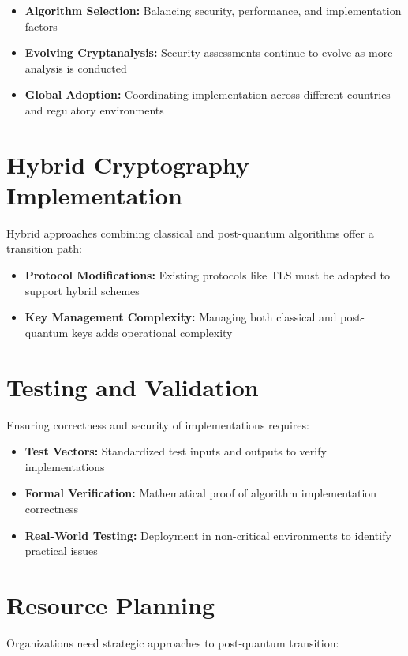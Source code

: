 \begin{itemize}
    \item \textbf{Algorithm Selection:} Balancing security, performance, and implementation factors
    
    \item \textbf{Evolving Cryptanalysis:} Security assessments continue to evolve as more analysis is conducted
    
    \item \textbf{Global Adoption:} Coordinating implementation across different countries and regulatory environments
\end{itemize}

\section{Hybrid Cryptography Implementation}
Hybrid approaches combining classical and post-quantum algorithms offer a transition path:

\begin{itemize}
    \item \textbf{Protocol Modifications:} Existing protocols like TLS must be adapted to support hybrid schemes
    
    \item \textbf{Key Management Complexity:} Managing both classical and post-quantum keys adds operational complexity
\end{itemize}

\section{Testing and Validation}
Ensuring correctness and security of implementations requires:

\begin{itemize}
    \item \textbf{Test Vectors:} Standardized test inputs and outputs to verify implementations
    
    \item \textbf{Formal Verification:} Mathematical proof of algorithm implementation correctness
    
    \item \textbf{Real-World Testing:} Deployment in non-critical environments to identify practical issues
\end{itemize}

\section{Resource Planning}
Organizations need strategic approaches to post-quantum transition:

